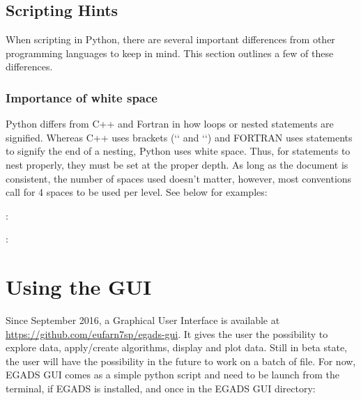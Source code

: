 \documentclass[a4paper,10pt,openany,english]{sphinxmanual}
\begin{document}
\subsection{Scripting Hints}
\label{tutorial:scripting-hints}
When scripting in Python, there are several important differences from other programming languages to keep in mind. This section outlines a few of these differences.


\subsubsection{Importance of white space}
\label{tutorial:importance-of-white-space}
Python differs from C++ and Fortran in how loops or nested statements are signified. Whereas C++ uses brackets (`\sphinxcode{\{}` and `\sphinxcode{\}}`) and FORTRAN uses  statements to signify the end of a nesting, Python uses white space. Thus, for statements to nest properly, they must be set at the proper depth. As long as the document is consistent, the number of spaces used doesn't matter, however, most conventions call for 4 spaces to be used per level. See below for examples:

:

\begin{sphinxVerbatim}[commandchars=\\\{\}]
  
   
      
   
 
 
\end{sphinxVerbatim}

:

\begin{sphinxVerbatim}[commandchars=\\\{\}]
  
   
        
     
 
\end{sphinxVerbatim}
\newpage

\section{Using the GUI}
\label{tutorial:using-the-gui}
Since September 2016, a Graphical User Interface is available at \url{https://github.com/eufarn7sp/egads-gui}. It gives the user the possibility to explore data, apply/create algorithms, display and plot data. Still in beta state, the user will have the possibility in the future to work on a batch of file. For now, EGADS GUI comes as a simple python script and need to be launch from the terminal, if EGADS is installed, and once in the EGADS GUI directory:
\end{document}
